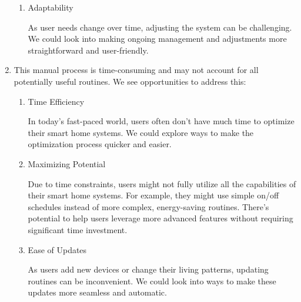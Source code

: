 \documentclass[conference]{IEEEtran}
\begin{document}
\begin{enumerate}[label=\arabic*]
\begin{enumerate}[label=\arabic*)]
        \item Adaptability\par
        \vspace{0.3em}
        As user needs change over time, adjusting the system can be challenging. We could look into making ongoing management and adjustments more straightforward and user-friendly.
    \end{enumerate}

    \vspace{1em} 

    \item This manual process is time-consuming and may not account for all potentially useful routines. We see opportunities to address this:
    \vspace{0.3em}
    
    \begin{enumerate}[label=\arabic*)]
        \item Time Efficiency\par
        \vspace{0.3em}
        In today's fast-paced world, users often don't have much time to optimize their smart home systems. We could explore ways to make the optimization process quicker and easier.

        \vspace{0.5em}

        \item Maximizing Potential\par
        \vspace{0.3em}
        Due to time constraints, users might not fully utilize all the capabilities of their smart home systems. For example, they might use simple on/off schedules instead of more complex, energy-saving routines. There's potential to help users leverage more advanced features without requiring significant time investment.

        \vspace{0.5em}

        \item Ease of Updates\par
        \vspace{0.3em}
        As users add new devices or change their living patterns, updating routines can be inconvenient. We could look into ways to make these updates more seamless and automatic.

        \vspace{0.5em}


\end{enumerate}
\end{enumerate}
\end{document}
